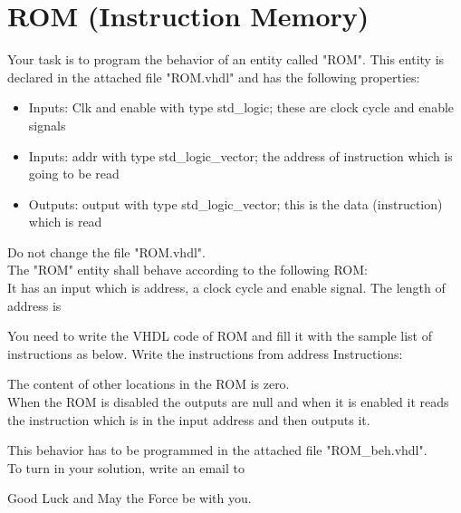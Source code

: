 \documentclass[a4paper,12pt]{article}
\begin{document}
\pagestyle{empty}
\setlength{\parindent}{0em} 
\section*{ROM (Instruction Memory)}


Your task is to program the behavior of an entity called "ROM". This entity is declared in the attached file "ROM.vhdl" and has the following properties:
\begin{itemize}
\item Inputs: Clk and enable with type std\_logic; these are clock cycle and enable signals
\item Inputs: addr with type std\_logic\_vector; the address of instruction which is going to be read
\item Outputs: output with type std\_logic\_vector; this is the data (instruction) which is read 
\end{itemize}
\vspace{0.3cm}

Do not change the file "ROM.vhdl".\\

The "ROM" entity shall behave according to the following ROM:\\

It has an input which is address, a clock cycle and enable signal. The length of address is %

You need to write the VHDL code of ROM and fill it with the sample list of instructions as below. Write the instructions from address %
Instructions:
\begin{center}
\end{center}

The content of other locations in the ROM is zero.
\\

When the ROM is disabled the outputs are null and when it is enabled it reads the instruction which is in the input address and then outputs it. 

This behavior has to be programmed in the attached file "ROM\_beh.vhdl".\\

To turn in your solution, write an email to %

\vspace{0.7cm}

Good Luck and May the Force be with you.
\end{document}
